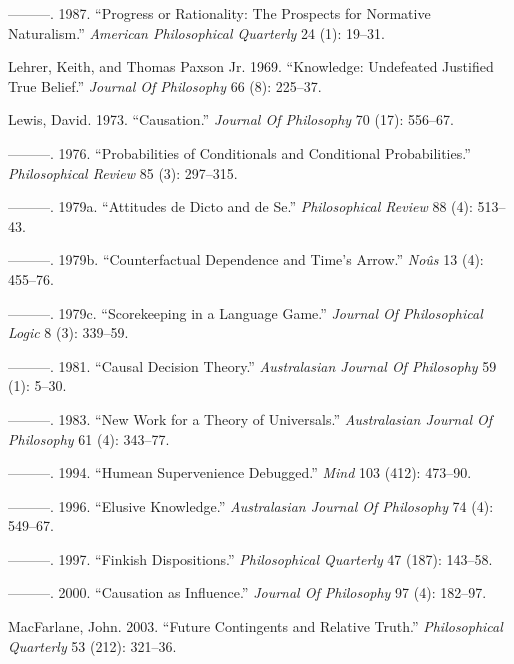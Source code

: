\documentclass[
  10pt,
  letterpaper,
  DIV=11,
  numbers=noendperiod,
  twoside]{scrartcl}
\newlength{\cslhangindent}
\newenvironment{CSLReferences}[2] %
 {\begin{list}{}{%
  \setlength{\itemindent}{0pt}
  \setlength{\leftmargin}{0pt}
  \setlength{\parsep}{0pt}
  \ifodd #1
   \setlength{\leftmargin}{\cslhangindent}
   \setlength{\itemindent}{-1\cslhangindent}
  \fi
  \setlength{\itemsep}{#2\baselineskip}}}
 {\end{list}}
\begin{document}
\begin{CSLReferences}{1}{0}
---------. 1987. {``Progress or Rationality: The Prospects for Normative
Naturalism.''} \emph{American Philosophical Quarterly} 24 (1): 19--31.

Lehrer, Keith, and Thomas Paxson Jr. 1969. {``Knowledge: Undefeated
Justified True Belief.''} \emph{Journal Of Philosophy} 66 (8): 225--37.

Lewis, David. 1973. {``Causation.''} \emph{Journal Of Philosophy} 70
(17): 556--67.

---------. 1976. {``Probabilities of Conditionals and Conditional
Probabilities.''} \emph{Philosophical Review} 85 (3): 297--315.

---------. 1979a. {``Attitudes de Dicto and de Se.''}
\emph{Philosophical Review} 88 (4): 513--43.

---------. 1979b. {``Counterfactual Dependence and Time's Arrow.''}
\emph{Noûs} 13 (4): 455--76.

---------. 1979c. {``Scorekeeping in a Language Game.''} \emph{Journal
Of Philosophical Logic} 8 (3): 339--59.

---------. 1981. {``Causal Decision Theory.''} \emph{Australasian
Journal Of Philosophy} 59 (1): 5--30.

---------. 1983. {``New Work for a Theory of Universals.''}
\emph{Australasian Journal Of Philosophy} 61 (4): 343--77.

---------. 1994. {``Humean Supervenience Debugged.''} \emph{Mind} 103
(412): 473--90.

---------. 1996. {``Elusive Knowledge.''} \emph{Australasian Journal Of
Philosophy} 74 (4): 549--67.

---------. 1997. {``Finkish Dispositions.''} \emph{Philosophical
Quarterly} 47 (187): 143--58.

---------. 2000. {``Causation as Influence.''} \emph{Journal Of
Philosophy} 97 (4): 182--97.

MacFarlane, John. 2003. {``Future Contingents and Relative Truth.''}
\emph{Philosophical Quarterly} 53 (212): 321--36.


\end{CSLReferences}
\end{document}
